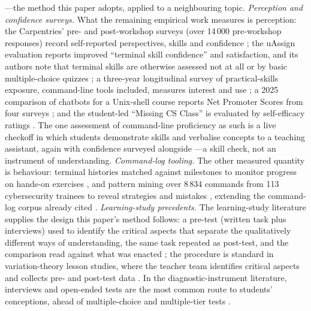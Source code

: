 \autocite{Pamplona2024VirtualMemory}---the method this paper adopts,
applied to a neighbouring topic.
\emph{Perception and confidence surveys.}
What the remaining empirical work measures is perception: the
Carpentries' pre- and post-workshop surveys (over 14\,000 pre-workshop
responses) record self-reported perspectives, skills and confidence
\autocite{Jordan2018Carpentry}; the uAssign evaluation reports improved
\enquote{terminal skill confidence} and satisfaction, and its authors note
that terminal skills are otherwise assessed not at all or by basic
multiple-choice quizzes \autocite{BaileyZilles2019uAssign}; a
three-year longitudinal survey of practical-skills exposure, command-line
tools included, measures interest and use \autocite{Buxton2024Perception};
a 2025 comparison of chatbots for a Unix-shell course reports Net Promoter
Scores from four surveys \autocite{Berengueres2025Chatbots}; and the
student-led \enquote{Missing CS Class} is evaluated by self-efficacy
ratings \autocite{Gilson2022MissingCSClass}.
The one assessment of command-line proficiency as such is a live checkoff
in which students demonstrate skills and verbalise concepts to a teaching
assistant, again with confidence surveyed alongside
\autocite{McMahon2026Checkoffs}---a skill check, not an instrument of
understanding.
\emph{Command-log tooling.}
The other measured quantity is behaviour: terminal histories matched
against milestones to monitor progress on hands-on exercises
\autocite{Mirkovic2020Terminal}, and pattern mining over 8\,834 commands
from 113 cybersecurity trainees to reveal strategies and mistakes
\autocite{Svabensky2022PatternMining}, extending the command-log corpus
already cited \autocite{Svabensky2021ShellCommands}.
\emph{Learning-study precedents.}
The learning-study literature supplies the design this paper's method
follows: a pre-test (written task plus interviews) used to identify the
critical aspects that separate the qualitatively different ways of
understanding, the same task repeated as post-test, and the comparison
read against what was enacted \autocite{PangMarton2005}; the procedure is
standard in variation-theory lesson studies, where the teacher team
identifies critical aspects and collects pre- and post-test data
\autocite{Kullberg2017ZDM}.
In the diagnostic-instrument literature, interviews and open-ended tests
are the most common route to students' conceptions, ahead of
multiple-choice and multiple-tier tests \autocite{KaltakciGurel2015Diagnostics}.


